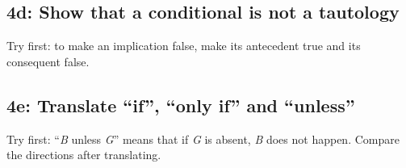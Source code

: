 \documentclass[11pt]{article}
\begin{document}
\begin{keepsection}
\begin{keepsection}
\end{keepsection}

\begin{keepsection}
\subsection{4d: Show that a conditional is not a tautology}

Try first: to make an implication false, make its antecedent true and its consequent false.

\end{keepsection}

\begin{keepsection}
\subsection{4e: Translate “if”, “only if” and “unless”}

Try first: “\textit{B} unless \textit{G}” means that if \textit{G} is absent, \textit{B} does not happen. Compare the directions after translating.

\end{keepsection}
\end{keepsection}
\end{document}
